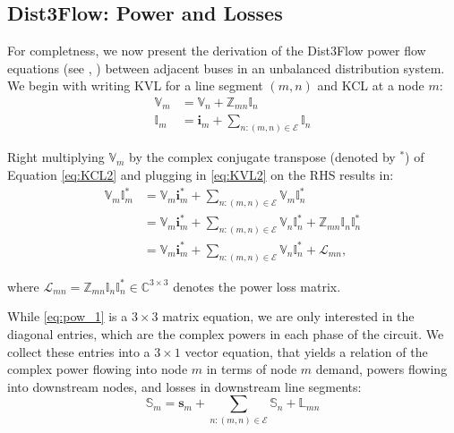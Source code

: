 \subsection{Dist3Flow: Power and Losses}
\label{subsec:power}

For completness, we now present the derivation of the Dist3Flow power flow equations (see \cite{arnold2015model}, \cite{sankur2016linear}) between adjacent buses in an unbalanced distribution system. We begin with writing KVL for a line segment $(m,n)$ and KCL at a node $m$:
\begin{align}
	\mathbb{V}_{m} &= \mathbb{V}_{n} + \mathbb{Z}_{mn} \mathbb{I}_{n}
    \label{eq:KVL2}
    \\
    \mathbb{I}_{m} &= \mathbf{i}_{m} + \sum_{n:(m,n) \in \mathcal{E}} \mathbb{I}_{n}
    \label{eq:KCL2}
\end{align}

Right multiplying $\mathbb{V}_{m}$ by the complex conjugate transpose (denoted by $^*$) of Equation \eqref{eq:KCL2} and plugging in \eqref{eq:KVL2} on the RHS results in:
\begin{align}
	\mathbb{V}_{m} \mathbb{I}_{m}^{*} &= \mathbb{V}_{m}\mathbf{i}_{m}^{*} + \sum_{n:(m,n) \in \mathcal{E}} \mathbb{V}_{m} \mathbb{I}_{n}^{*} \nonumber \\
	&= \mathbb{V}_{m}  \mathbf{i}_{m}^{*} + \sum_{n:(m,n) \in \mathcal{E}} \mathbb{V}_{n}  \mathbb{I}_{n}^{*} + \mathbb{Z}_{mn} \mathbb{I}_{n} \mathbb{I}_{n}^{*} \label{eq:pow_11} \\
    &= \mathbb{V}_{m}  \mathbf{i}_{m}^{*} + \sum_{n:(m,n) \in \mathcal{E}} \mathbb{V}_{n}  \mathbb{I}_{n}^{*} + \mathcal L_{mn} \label{eq:pow_1},
\end{align}

\noindent where $\mathcal L_{mn} = \mathbb{Z}_{mn} \mathbb{I}_{n} \mathbb{I}_{n}^{*} \in \mathbb C^{3 \times 3}$ denotes the power loss matrix.

While \eqref{eq:pow_1} is a $3 \times 3$ matrix equation, we are only interested in the diagonal entries, which are the complex powers in each phase of the circuit.  We collect these entries into a $3 \times 1$ vector  equation, that yields a relation of the complex power flowing into node $m$ in terms of node $m$ demand, powers flowing into downstream nodes, and losses in downstream line segments:
\begin{equation}
	\mathbb{S}_{m} = \mathbf{s}_{m} + \sum_{n:(m,n) \in \mathcal{E}} \mathbb{S}_{n} + \mathbb{L}_{mn}
    \label{eq:pow_2}
\end{equation}


